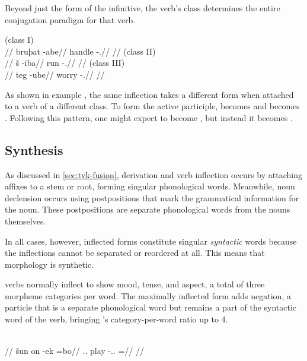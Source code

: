 Beyond just the form of the infinitive, the verb's class determines the entire conjugation paradigm for that verb.

	\begingl
		\glpreamble{} (class I)\\
		//
		\gla bruþat -abe//
		\glb handle -\Act.\Ptcp//
		\glft {}//
	\endgl
	\a<cl2>\begingl
		\glpreamble{} (class II)\\
		//
		\gla š -iba//
		\glb run -\Act.\Ptcp//
		\glft {}//
	\endgl
	\a<cl3>\begingl
		\glpreamble{} (class III)\\
		//
		\gla teg -ube//
		\glb worry -\Act.\Ptcp//
		\glft {}//
	\endgl
\xe

As shown in example , the same inflection takes a different form when attached to a verb of a different class. To form the active participle,  becomes  and  becomes . Following this pattern, one might expect  to become \ungr{}, but instead it becomes .


\subsection{Synthesis}
\label{sec:tvk-synthesis}

As discussed in \autoref{sec:tvk-fusion}, derivation and verb inflection occurs by attaching affixes to a stem or root, forming singular phonological words. Meanwhile, noun declension occurs using postpositions that mark the grammatical information for the noun. These postpositions are separate phonological words from the nouns themselves.

In all cases, however, inflected forms constitute singular \emph{syntactic} words because the inflections cannot be separated or reordered at all. This means that \langtvk{} morphology is synthetic\autocite{wals-22}.

\langtvk{} verbs normally inflect to show mood, tense, and aspect, a total of three morpheme categories per word. The maximally inflected form adds negation, a particle that is a separate phonological word but remains a part of the syntactic word of the verb, bringing \langtvk's category-per-word ratio up to 4\autocite{wals-22}.

	\begingl
		\glpreamble{}\\
		//
		\gla šun on -ek =bo//
		\glb \Tps.\An.\Top{} play -\Ind.\Pst.\Pfv{} =\Neg//
		\glft {}//
	\endgl
\xe



